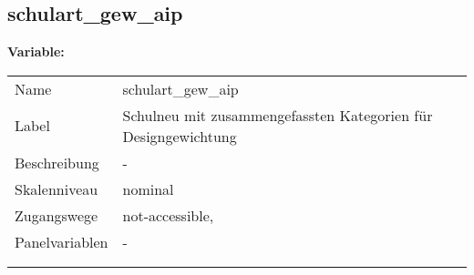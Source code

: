	
	
	\subsection{schulart\_gew\_aip}
	\label{subSection:schulart_gew_aip}

	\noindent\textbf{Variable:}\\
		\begin{tabular}{lL{11.3cm}}
			\label{tableVariable:schulart_gew_aip}
			Name & schulart\_gew\_aip \\
			Label & Schulneu mit zusammengefassten Kategorien für Designgewichtung \\
			Beschreibung & - \\
			Skalenniveau & nominal \\
			Zugangswege &
				not-accessible,
 \\
			Panelvariablen & -
			 \\
			 \\
 \\
		\end{tabular}






	
	\newpage
